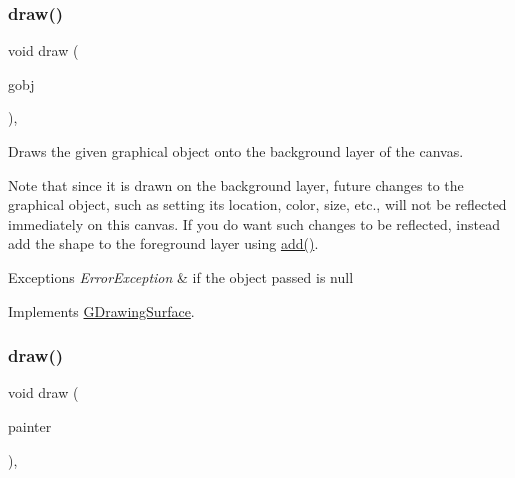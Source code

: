 \mbox{\label{classGCanvas_a7f7f6c1798bcedfd52151b458074e8a0}} 
\subsubsection{\texorpdfstring{draw()}{draw()}\hspace{0.1cm}{\footnotesize\ttfamily [4/5]}}
{\footnotesize\ttfamily void draw (\begin{DoxyParamCaption}\item[{\mbox{\hyperlink{classGObject}{G\+Object}} $\ast$}]{gobj }\end{DoxyParamCaption})\hspace{0.3cm}{\ttfamily [override]}, {\ttfamily [virtual]}}



Draws the given graphical object onto the background layer of the canvas. 

Note that since it is drawn on the background layer, future changes to the graphical object, such as setting its location, color, size, etc., will not be reflected immediately on this canvas. If you do want such changes to be reflected, instead add the shape to the foreground layer using \mbox{\hyperlink{classGCanvas_afe8277e7b2627513c6f7452fb0b2847d}{add()}}. 
\begin{DoxyExceptions}{Exceptions}
{\em Error\+Exception} & if the object passed is null \\
\hline
\end{DoxyExceptions}


Implements \mbox{\hyperlink{classGDrawingSurface_ae65b7cc9bdfbc1bd01bec80ba83aab47}{G\+Drawing\+Surface}}.

\mbox{\label{classGCanvas_ab4536ea39f3b3899136554bdd5bda581}} 
\subsubsection{\texorpdfstring{draw()}{draw()}\hspace{0.1cm}{\footnotesize\ttfamily [5/5]}}
{\footnotesize\ttfamily void draw (\begin{DoxyParamCaption}\item[{Q\+Painter $\ast$}]{painter }\end{DoxyParamCaption})\hspace{0.3cm}{\ttfamily [override]}, {\ttfamily [virtual]}}




